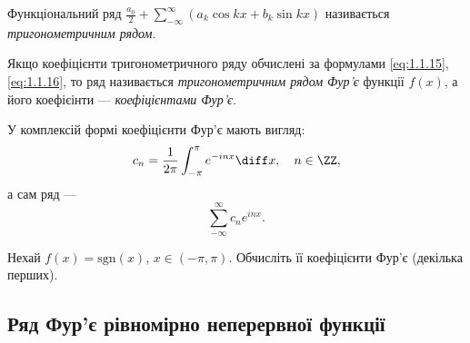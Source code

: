 \begin{definition}
    Функціональний ряд $\frac{a_0}{2} + \sum_{-\infty}^\infty (a_k \cos k x + b_k \sin k x)$ називається \textit{тригонометричним рядом}.
\end{definition}

\begin{definition}
    Якщо коефіцієнти тригонометричного ряду обчислені за формулами \eqref{eq:1.1.15}, \eqref{eq:1.1.16}, то ряд називається \textit{тригонометричним рядом Фур'є} функції $f(x)$, а його коефієінти --- \textit{коефіцієнтами Фур'є}.
\end{definition}

\begin{remark}
    У комплексій формі коефіцієнти Фур'є мають вигляд:
    \begin{equation}
        c_n = \frac{1}{2 \pi} \int_{-\pi}^\pi e^{-i n x} \diff x, \quad n \in \ZZ,
    \end{equation}
    а сам ряд ---
    \begin{equation}
        \sum_{-\infty}^\infty c_n e^{i n x}.
    \end{equation}
\end{remark}

\begin{exercise}
    Нехай $f(x) = \text{sgn}(x)$, $x \in (-\pi, \pi)$. Обчисліть її коефіцієнти Фур'є (декілька перших).
\end{exercise}

\subsection{Ряд Фур'є рівномірно неперервної функції}

